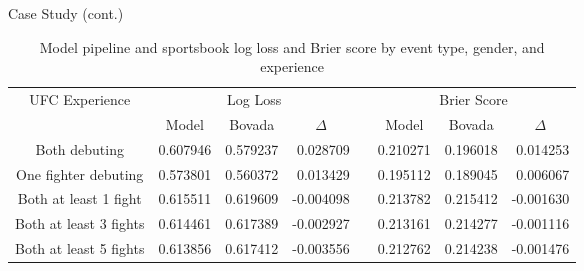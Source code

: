 \documentclass[aspectratio=169,xcolor=dvipsnames]{beamer}
\begin{document}
\begin{frame}{Case Study (cont.)}
    \tiny 
    \begin{table}[!htb]
    \centering
    \begin{tabular}{@{}cccrcccr@{}}
    \toprule
    \multirow{2}{*}{UFC Experience} & \multicolumn{3}{c}{Log Loss}                       & \multirow{2}{*}{}    & \multicolumn{3}{c}{Brier Score}                    \\ \cmidrule(lr){2-4} \cmidrule(l){6-8} 
                                    & Model    & Bovada   & \multicolumn{1}{c}{$\Delta$} &                      & Model    & Bovada   & \multicolumn{1}{c}{$\Delta$} \\ \midrule
    Both debuting                   & 0.607946 & 0.579237 & 0.028709                     &                      & 0.210271 & 0.196018 & 0.014253                     \\
    One fighter debuting            & 0.573801 & 0.560372 & 0.013429                    & \multicolumn{1}{l}{} & 0.195112 & 0.189045 & 0.006067                     \\
    Both at least 1 fight           & 0.615511 & 0.619609 & -0.004098                    & \multicolumn{1}{l}{} & 0.213782 & 0.215412 & -0.001630                    \\
    Both at least 3 fights          & 0.614461 & 0.617389 & -0.002927                    & \multicolumn{1}{l}{} & 0.213161 & 0.214277 & -0.001116                    \\
    Both at least 5 fights          & 0.613856 & 0.617412 & -0.003556                    &                      & 0.212762 & 0.214238 & -0.001476                   \\ \bottomrule
    \end{tabular}
    \normalsize
    \caption{Model pipeline and sportsbook log loss and Brier score by event type, gender, and experience}
    \end{table}
\end{frame}

\end{document}

